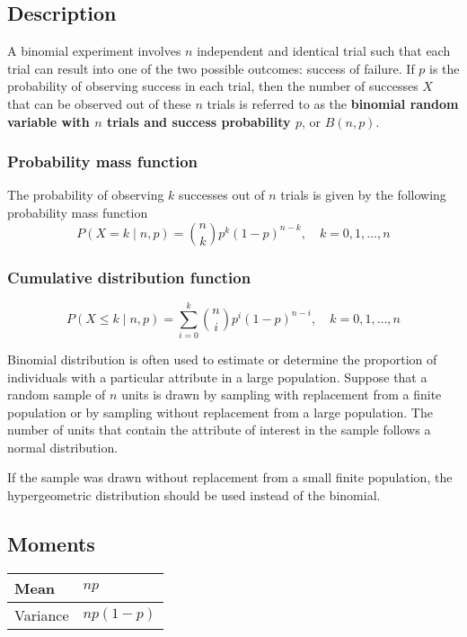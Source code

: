 \subsection{Description}
A binomial experiment involves $n$ independent and identical trial such that each trial can result into one of the two possible outcomes: success of failure. If $p$ is the probability of observing success in each trial, then the number of successes $X$ that can be observed out of these $n$ trials is referred to as the \textbf{binomial random variable with $n$ trials and success probability $p$}, or $B(n, p)$.

\subsubsection{Probability mass function}
The probability of observing $k$ successes out of $n$ trials is given by the following probability mass function
\[
	P(X = k \mid n, p) = \binom{n}{k}p^{k}(1 - p)^{n - k}, \quad k = 0, 1, \ldots, n
\]

\subsubsection{Cumulative distribution function}
\[
	P(X \leq k \mid n, p) = \sum_{i = 0}^{k} \binom{n}{i}p^{i}(1 - p)^{n - i}, \quad k = 0, 1, \ldots, n
\]

Binomial distribution is often used to estimate or determine the proportion of individuals with a particular attribute in a large population. Suppose that a random sample of $n$ units is drawn by sampling with replacement from a finite population or by sampling without replacement from a large population. The number of units that contain the attribute of interest in the sample follows a normal distribution.

If the sample was drawn without replacement from a small finite population, the hypergeometric distribution should be used instead of the binomial.

\subsection{Moments}

\begin{tabular}{p{} p{}}
	\hline
	Mean & $np$ \\\hline
	Variance & $np(1 - p)$\\\hline
\end{tabular}

